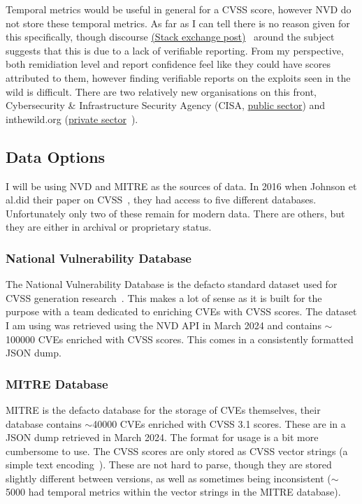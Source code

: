 \documentclass[12pt]{article}
\begin{document}
Temporal metrics would be useful in general for a CVSS score, however NVD do not store these
temporal metrics. As far as I can tell there is no reason given for this specifically, though
discourse
\href{https://security.stackexchange.com/questions/270257/cvss-v3-and-v3-1-missing-temporal-metrics-exploit-code-maturity-and-remediation}{(Stack exchange post)}~\cite{stack_exchange} around the subject suggests that this is due to a lack
of verifiable reporting. From my perspective, both remidiation level and report confidence feel like
they could have scores attributed to them, however finding verifiable reports on the exploits seen
in the wild is difficult. There are two relatively new organisations on this front,
Cybersecurity \& Infrastructure Security Agency (CISA,
\href{https://www.cisa.gov/known-exploited-vulnerabilities-catalog}{public sector}) and
inthewild.org (\href{https://inthewild.io/}{private sector}~\cite{cisa}).

\subsection{Data Options}

I will be using NVD and MITRE as the sources of data. In 2016 when Johnson et al.\@ did their paper
on CVSS~\cite{bayes}, they had access to five different databases. Unfortunately only two of these
remain for modern data. There are others, but they are either in archival or proprietary status.

\subsubsection{National Vulnerability Database} \label{NVD_SECTION}

The National Vulnerability Database is the defacto standard dataset used for CVSS generation
research~\cite{costa, nvd_example1, nvd_example2}.  This makes a lot of sense as it is built
for the purpose with a team dedicated to enriching CVEs with CVSS scores. The dataset I am using was
retrieved using the NVD API in March 2024 and contains $\sim$100000 CVEs enriched with CVSS scores. This
comes in a consistently formatted JSON dump.

\subsubsection{MITRE Database}  \label{MITRE_SECTION}

MITRE is the defacto database for the storage of CVEs themselves, their database contains $\sim$40000
CVEs enriched with CVSS 3.1 scores. These are in a JSON dump retrieved in March 2024. The
format for usage is a bit more cumbersome to use. The CVSS scores are only stored as CVSS vector
strings (a simple text encoding~\cite{vector_string}). These are not hard to parse, though they are stored slightly
different between versions, as well as sometimes being inconsistent ($\sim$5000 had temporal metrics within
the vector strings in the MITRE database).
\end{document}
